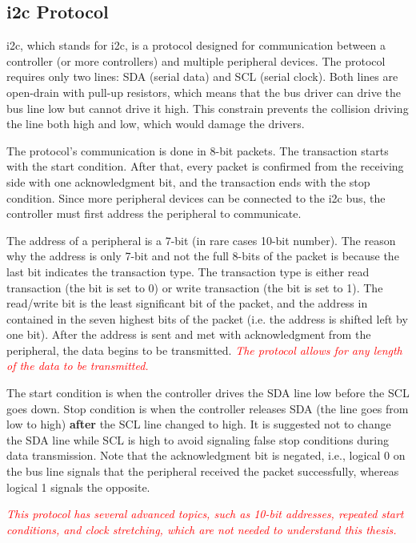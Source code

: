 \documentclass[
  digital,     %
  oneside,     %
  nosansbold,  %
  nocolorbold, %
  lof,         %
  lot,         %
]{fithesis4}
\newcommand{\TODO}[1]{\textcolor{red}{\textit{#1}}}
\begin{document}
{{{\subsection[ Inter-Integrated Circuit Protocol ]{ \acrlong{i2c} Protocol } \label{sec:i2c}
\acrshort{i2c}, which stands for \acrlong{i2c}, is a protocol designed for communication between a controller (or more controllers) and multiple peripheral devices. The protocol requires only two lines: SDA (serial data) and SCL (serial clock). Both lines are open-drain with pull-up resistors, which means that the bus driver can drive the bus line low but cannot drive it high. This constrain prevents the collision  driving the line both high and low, which would damage the drivers.

The protocol's communication is done in 8-bit packets. The transaction starts with the start condition. After that, every packet is confirmed from the receiving side with one acknowledgment bit, and the transaction ends with the stop condition. Since more peripheral devices can be connected to the \acrshort{i2c} bus, the controller must first address the peripheral to communicate.

The address of a peripheral is a 7-bit (in rare cases 10-bit number). The reason why the address is only 7-bit and not the full 8-bits of the packet is because the last bit indicates the transaction type. The transaction type is either read transaction (the bit is set to 0) or write transaction (the bit is set to 1). The read/write bit is the least significant bit of the packet, and the address in contained in the seven highest bits of the packet (i.e. the address is shifted left by one bit). After the address is sent and met with acknowledgment from the peripheral, the data begins to be transmitted. \TODO{The protocol allows for any length of the data to be transmitted.}

The start condition is when the controller drives the SDA line low before the SCL goes down. Stop condition is when the controller releases SDA (the line goes from low to high) \textbf{after} the SCL line changed to high. It is suggested not to change the SDA line while SCL is high to avoid signaling false stop conditions during data transmission. Note that the acknowledgment bit is negated, i.e., logical 0 on the bus line signals that the peripheral received the packet successfully, whereas logical 1 signals the opposite.

\TODO{This protocol has several advanced topics, such as 10-bit addresses, repeated start conditions, and clock stretching, which are not needed to understand this thesis.}

}}}
\end{document}
